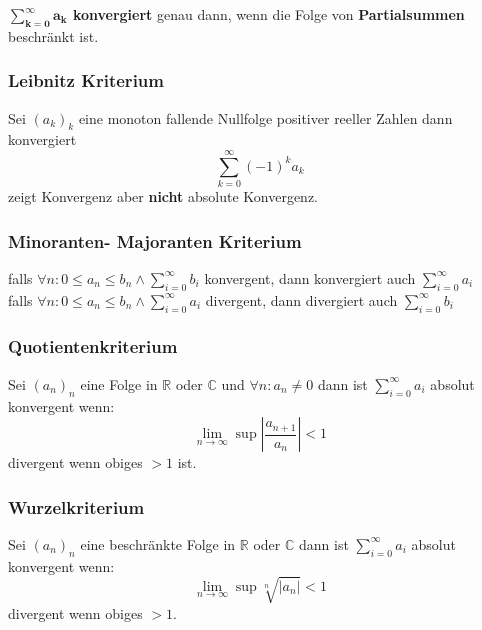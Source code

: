 \textbf{$\bm{\sum_{k=0}^{\infty}a_k}$ konvergiert} genau dann, wenn die Folge von \textbf{Partialsummen} beschränkt ist.

\subsubsection{Leibnitz Kriterium}
Sei $(a_k)_k$ eine monoton fallende Nullfolge positiver reeller Zahlen dann konvergiert\\
\[\sum\limits_{k=0}^{\infty}(-1)^ka_k\]
zeigt Konvergenz aber \textbf{nicht} absolute Konvergenz.


\subsubsection{Minoranten- Majoranten Kriterium}
falls $\forall n: 0\leq a_n \leq b_n \wedge \sum_{i=0}^{\infty}b_i$ konvergent, dann konvergiert auch $\sum_{i=0}^{\infty}a_i$\\

falls $\forall n: 0\leq a_n \leq b_n \wedge \sum_{i=0}^{\infty}a_i$ divergent, dann divergiert auch $\sum_{i=0}^{\infty}b_i$\\


\subsubsection{Quotientenkriterium}
Sei $(a_n)_n$ eine Folge in $\mathbb{R}$ oder $\mathbb{C}$ und $\forall n :a_n \neq 0$ dann ist $\sum_{i=0}^{\infty}a_i$ absolut konvergent wenn:
\[\lim\limits_{n\to \infty}\sup\left|\frac{a_{n+1}}{a_n}\right|<1\]
divergent wenn obiges $>1$ ist.

\subsubsection{Wurzelkriterium}
Sei $(a_n)_n$ eine beschränkte Folge in $\mathbb{R}$ oder $\mathbb{C}$ dann ist $\sum_{i=0}^{\infty}a_i$ absolut konvergent wenn:
\[\lim\limits_{n\to \infty}\sup \sqrt[n]{|a_n|}<1\]
divergent wenn obiges $>1$.

